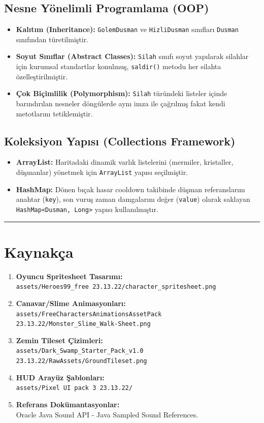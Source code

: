 \documentclass[12pt]{article}
\begin{document}
\subsection{Nesne Yönelimli Programlama (OOP)}
\begin{itemize}
    \item \textbf{Kalıtım (Inheritance):} \texttt{GolemDusman} ve \texttt{HizliDusman} sınıfları \texttt{Dusman} sınıfından türetilmiştir.
    \item \textbf{Soyut Sınıflar (Abstract Classes):} \texttt{Silah} sınıfı soyut yapılarak silahlar için kurumsal standartlar konulmuş, \texttt{saldir()} metodu her silahta özelleştirilmiştir.
    \item \textbf{Çok Biçimlilik (Polymorphism):} \texttt{Silah} türündeki listeler içinde barındırılan nesneler döngülerde aynı imza ile çağrılmış fakat kendi metotlarını tetiklemiştir.
\end{itemize}

\subsection{Koleksiyon Yapısı (Collections Framework)}
\begin{itemize}
    \item \textbf{ArrayList:} Haritadaki dinamik varlık listelerini (mermiler, kristaller, düşmanlar) yönetmek için \texttt{ArrayList} yapısı seçilmiştir.
    \item \textbf{HashMap:} Dönen bıçak hasar cooldown takibinde düşman referanslarını anahtar (\texttt{key}), son vuruş zaman damgalarını değer (\texttt{value}) olarak saklayan \texttt{HashMap\textless Dusman, Long\textgreater} yapısı kullanılmıştır.
\end{itemize}

\bigskip
\hrule
\bigskip

\section{Kaynakça}
\begin{enumerate}
    \item \textbf{Oyuncu Spritesheet Tasarımı:} \\
    \texttt{assets/Heroes99\_free 23.13.22/character\_spritesheet.png}
    \item \textbf{Canavar/Slime Animasyonları:} \\
    \texttt{assets/FreeCharactersAnimationsAssetPack 23.13.22/Monster\_Slime\_Walk-Sheet.png}
    \item \textbf{Zemin Tileset Çizimleri:} \\
    \texttt{assets/Dark\_Swamp\_Starter\_Pack\_v1.0 23.13.22/RawAssets/GroundTileset.png}
    \item \textbf{HUD Arayüz Şablonları:} \\
    \texttt{assets/Pixel UI pack 3 23.13.22/}
    \item \textbf{Referans Dokümantasyonlar:} \\
    Oracle Java Sound API - Java Sampled Sound References.
\end{enumerate}
\end{document}
